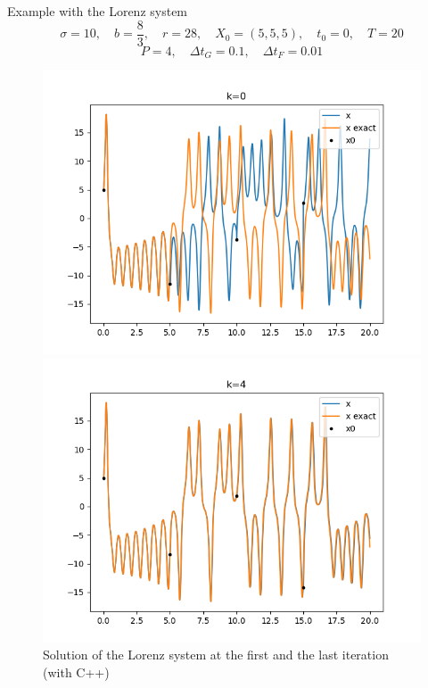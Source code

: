\begin{frame}{Example with the Lorenz system}
	\texttt{$$\sigma=10, \quad b=\frac{8}{3}, \quad r=28, \quad X_0=(5,5,5), \quad t_0=0, \quad T=20$$}
	$$P=4,\quad \Delta t_G=0.1, \quad \Delta t_F=0.01$$
	\begin{figure}
		\centering
		\begin{minipage}{0.48\linewidth}
			\includegraphics[width=\linewidth]{"images/parareal/lorenz_sol_0.png"}
		\end{minipage}
		\begin{minipage}{0.48\linewidth}
			\includegraphics[width=\linewidth]{"images/parareal/lorenz_sol_4.png"}
		\end{minipage}
		\caption{Solution of the Lorenz system at the first and the last iteration (with C++)}
	\end{figure}
\end{frame}

